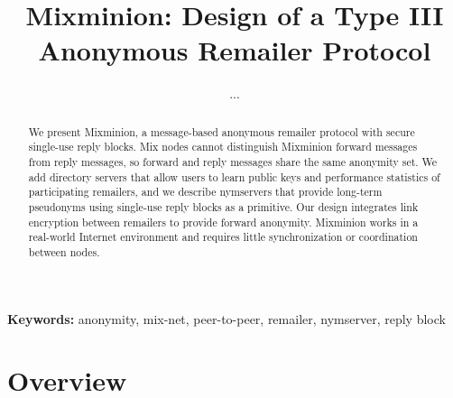 \documentclass[11pt]{IEEEtran}
\newcommand\emailaddr{\begingroup \def\UrlLeft{<}\def\UrlRight{>}\urlstyle{tt}\Url}
\begin{document}

\title{Mixminion: Design of a Type III Anonymous Remailer Protocol}

% 
\author{...}

\maketitle
\pagestyle{plain} 
 
\begin{abstract}
We present Mixminion, a message-based anonymous remailer protocol with
secure single-use reply blocks. Mix nodes cannot distinguish
Mixminion forward messages from reply messages, so forward and reply
messages share
the same anonymity set. We add directory servers that allow users to
learn public keys and performance statistics of participating remailers,
and we describe nymservers that provide long-term
pseudonyms using single-use reply blocks as a primitive. Our design
integrates link encryption between remailers to provide
forward anonymity. Mixminion works in a real-world Internet environment and
requires little synchronization or coordination between nodes.
\end{abstract}

\begin{center}
\textbf{Keywords:} anonymity, mix-net, peer-to-peer, remailer, nymserver, reply block
\end{center}


\section{Overview}
\label{sec:intro}
\end{document}
